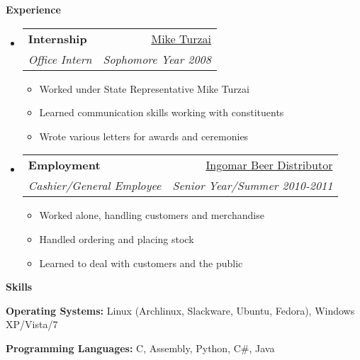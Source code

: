 \documentclass[letterpaper,11pt]{article}
\makeatletter
\newcommand{\resheading}[1]{{\large \colorbox{mygrey}{\begin{minipage}{\textwidth}{\textbf{#1 \vphantom{p\^{E}}}}\end{minipage}}}}
\newcommand{\ressubheading}[4]{
\begin{tabular*}{6.5in}{l@{\extracolsep{\fill}}r}
		\textbf{#1} & #2 \\
		\textit{#3} & \textit{#4} \\
\end{tabular*}\vspace{-6pt}}
\makeatother
\begin{document}
\resheading{Experience}
	\begin{itemize}
		\item	
			\ressubheading{Internship}{\href{http://www.repturzai.com/}{Mike Turzai}}{Office Intern}{Sophomore Year 2008} 
				{ \footnotesize 
				\begin{itemize}
					\item{Worked under State Representative Mike Turzai}
					\item{Learned communication skills working with constituents}
					\item{Wrote various letters for awards and ceremonies}
				\end{itemize}
				}
		\item 
			\ressubheading{Employment}{\href{https://www.facebook.com/pages/Ingomar-Beer-Distributor/120207034680524}{Ingomar Beer Distributor}}{Cashier/General Employee}{Senior Year/Summer 2010-2011}
			{ \footnotesize
				\begin{itemize}
					\item{Worked alone, handling customers and merchandise}
					\item{Handled ordering and placing stock}
					\item{Learned to deal with customers and the public}
				\end{itemize}
			}
		
	\end{itemize}  %

\resheading{{Skills}}
	\begin{description}
		\item{\textbf{Operating Systems: }{Linux (Archlinux, Slackware, Ubuntu, Fedora), Windows XP/Vista/7}}
		\item{\textbf{Programming Languages: }{C, Assembly, Python, C\#, Java}}
	\end{description}
\end{document}
